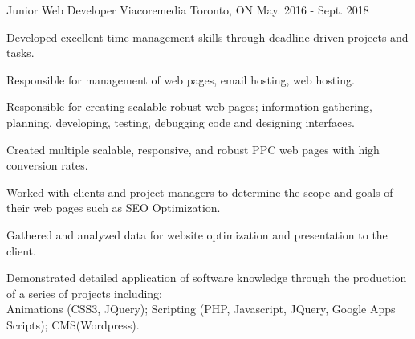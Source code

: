 \begin{cventries}
\cventry
{Junior Web Developer} %
{Viacoremedia} %
{Toronto, ON} %
{May. 2016 - Sept. 2018} %
{ %
\begin{cvitems}
\item {Developed excellent time-management skills through deadline driven projects and tasks.}
\item {Responsible for management of web pages, email hosting, web hosting.}
\item {Responsible for creating scalable robust web pages; information gathering, planning, developing, testing, debugging code and designing interfaces.}
\item {Created multiple scalable, responsive, and robust PPC web pages with high conversion rates.}
\item {Worked with clients and project managers to determine the scope and goals of their web pages such as SEO Optimization.}
\item {Gathered and analyzed data for website optimization and presentation to the client.}
\item {Demonstrated detailed application of software knowledge through the production of a series of projects including: \\Animations (CSS3, JQuery); Scripting (PHP, Javascript, JQuery, Google Apps Scripts); CMS(Wordpress).}
\end{cvitems}
}

\end{cventries}